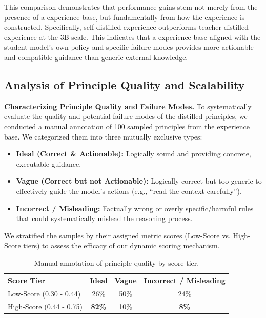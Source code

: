 This comparison demonstrates that performance gains stem not merely from the presence of a experience base, but fundamentally from how the experience is constructed. Specifically, self-distilled experience outperforms teacher-distilled experience at the 3B scale. This indicates that a experience base aligned with the student model's own policy and specific failure modes provides more actionable and compatible guidance than generic external knowledge.



\subsection{Analysis of Principle Quality and Scalability}
\label{sec:quality_and_scalability}

\textbf{Characterizing Principle Quality and Failure Modes.} 
To systematically evaluate the quality and potential failure modes of the distilled principles, we conducted a manual annotation of 100 sampled principles from the experience base. We categorized them into three mutually exclusive types:

\begin{itemize}[leftmargin=2em]
    \item \textbf{Ideal (Correct \& Actionable):} Logically sound and providing concrete, executable guidance.
    \item \textbf{Vague (Correct but not Actionable):} Logically correct but too generic to effectively guide the model's actions (e.g., ``read the context carefully'').
    \item \textbf{Incorrect / Misleading:} Factually wrong or overly specific/harmful rules that could systematically mislead the reasoning process.
\end{itemize}

We stratified the samples by their assigned metric scores (Low-Score vs. High-Score tiers) to assess the efficacy of our dynamic scoring mechanism.

\begin{table}[ht]
\centering
\caption{Manual annotation of principle quality by score tier.}
\label{tab:principle_quality}
\begin{tabular}{lccc}
\toprule
\textbf{Score Tier} & \textbf{Ideal} & \textbf{Vague} & \textbf{Incorrect / Misleading} \\
\midrule
Low-Score (0.30 - 0.44) & 26\% & 50\% & 24\% \\
High-Score (0.44 - 0.75) & \textbf{82\%} & 10\% & \textbf{8\%} \\
\bottomrule
\end{tabular}
\end{table}

